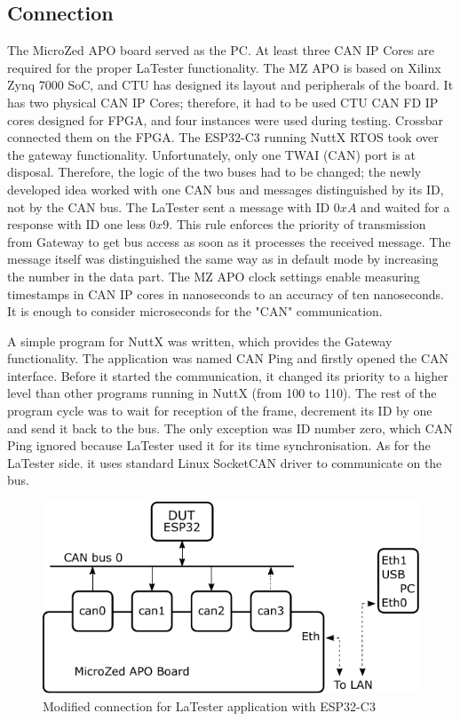 \documentclass{ctuthesis}
\begin{document}
 \subsection{Connection}
 \label{Sub:connection}
 The MicroZed APO board served as the PC. At least three CAN IP Cores are required for the proper LaTester functionality. The MZ APO is based on Xilinx Zynq 7000 SoC, and CTU has designed its layout and peripherals of the board. It has two physical CAN IP Cores; therefore, it had to be used CTU CAN FD IP cores designed for FPGA, and four instances were used during testing\cite{ctu-ip-core}. Crossbar connected them on the FPGA. The ESP32-C3 running NuttX RTOS took over the gateway functionality. Unfortunately, only one TWAI (CAN) port is at disposal. Therefore,  the logic of the two buses had to be changed; the newly developed idea worked with one CAN bus and messages distinguished by its ID, not by the CAN bus. The LaTester sent a message with ID $0xA$ and waited for a response with ID one less $0x9$. This rule enforces the priority of transmission from Gateway to get bus access as soon as it processes the received message. The message itself was distinguished the same way as in default mode by increasing the number in the data part. The MZ APO clock settings enable measuring timestamps in CAN IP cores in nanoseconds to an accuracy of ten nanoseconds. It is enough to consider microseconds for the "CAN" communication. \newline
 
 \quad A simple program for NuttX was written, which provides the Gateway functionality. The application was named CAN Ping and firstly opened the CAN interface. Before it started the communication, it changed its priority to a higher level than other programs running in NuttX (from 100 to 110). The rest of the program cycle was to wait for reception of the frame, decrement its ID by one and send it back to the bus. The only exception was ID number zero, which CAN Ping ignored because LaTester used it for its time synchronisation. As for  the LaTester side. it uses standard Linux SocketCAN driver to communicate on the bus.
\clearpage
 \begin{figure}[htb]
 \includegraphics[width=1\textwidth]{images/latester2.pdf}
 \caption{Modified connection for LaTester application with ESP32-C3}
 \end{figure}
 
\end{document}
